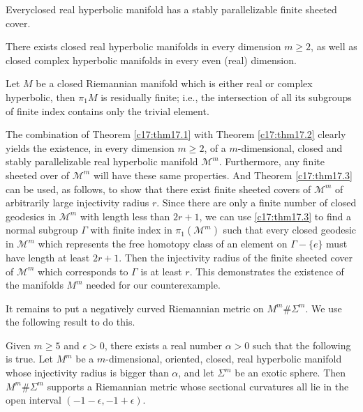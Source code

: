 \begin{thm}[Sullivan]\label{c17:thm17.1}
Every\pageoriginale closed real hyperbolic manifold has a stably
parallelizable finite sheeted cover.
\end{thm}

\begin{thm}[Borel]\label{c17:thm17.2}
There exists closed real hyperbolic manifolds in every dimension
$m\geq 2$, as well as closed complex hyperbolic manifolds in every
even (real) dimension.
\end{thm}

\begin{thm}[Malcev]\label{c17:thm17.3}
Let $M$ be a closed Riemannian manifold which is either real or
complex hyperbolic, then $\pi_{1}M$ is residually finite; i.e., the
intersection of all its subgroups of finite index contains only the
trivial element.
\end{thm}

The combination of Theorem \ref{c17:thm17.1} with Theorem
\ref{c17:thm17.2} clearly yields the existence, in every dimension
$m\geq 2$, of a $m$-dimensional, closed and stably parallelizable real
hyperbolic manifold $\mathcal{M}^{m}$. Furthermore, any finite sheeted
over of $\mathcal{M}^{m}$ will have these same properties. And Theorem
\ref{c17:thm17.3} can be used, as follows, to show that there exist
finite sheeted covers of $\mathcal{M}^{m}$ of arbitrarily large
injectivity radius $r$. Since there are only a finite number of closed
geodesics in $\mathcal{M}^{m}$ with length less than $2r+1$, we can
use \ref{c17:thm17.3} to find a normal subgroup $\Gamma$ with finite
index in $\pi_{1}(\mathcal{M}^{m})$ such that every closed geodesic in
$\mathcal{M}^{m}$ which represents the free homotopy class of an
element on $\Gamma-\{e\}$ must have length at least $2r+1$. Then the
injectivity radius of the finite sheeted cover of $\mathcal{M}^{m}$
which corresponds to $\Gamma$ is at least $r$. This demonstrates the
existence of the manifolds $M^{m}$ needed for our counterexample.

It remains to put a negatively curved Riemannian metric on $M^{m}\#
\Sigma^{m}$. We use the following result to do this.

\begin{lemma}\label{c17:lem17.4}
Given $m\geq 5$ and $\epsilon>0$, there exists a real number
$\alpha>0$ such that the following is true. Let $M^{m}$ be a
$m$-dimensional, oriented, closed, real hyperbolic manifold whose
injectivity radius is bigger than $\alpha$, and let $\Sigma^{m}$ be an
exotic sphere. Then $M^{m}\# \Sigma^{m}$ supports a Riemannian metric
whose sectional curvatures all lie in the open interval
$(-1-\epsilon,-1+\epsilon)$. 
\end{lemma}

